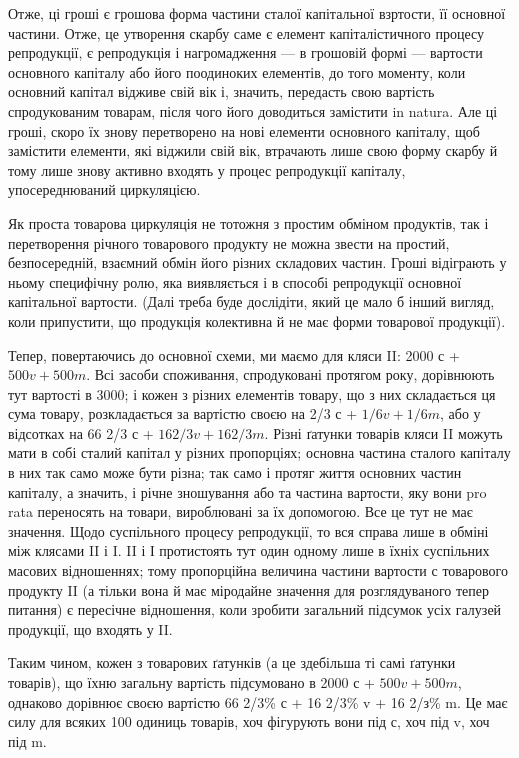 \parcont{}  %
Отже, ці гроші є грошова форма частини сталої капітальної взртости,
її основної частини. Отже, це утворення скарбу саме є елемент капіталістичного
процесу репродукції, є репродукція і нагромадження — в грошовій
формі — вартости основного капіталу або його поодиноких елементів,
до того моменту, коли основний капітал відживе свій вік і, значить, передасть
свою вартість спродукованим товарам, після чого його доводиться
замістити in natura. Але ці гроші, скоро їх знову перетворено на нові
елементи основного капіталу, щоб замістити елементи, які віджили свій
вік, втрачають лише свою форму скарбу й тому лише знову активно
входять у процес репродукції капіталу, упосереднюваний циркуляцією.

Як проста товарова циркуляція не тотожня з простим обміном продуктів,
так і перетворення річного товарового продукту не можна звести на
простий, безпосередній, взаємний обмін його різних складових частин.
Гроші відіграють у ньому специфічну ролю, яка виявляється і в способі
репродукції основної капітальної вартости. (Далі треба буде дослідіти,
який це мало б інший вигляд, коли припустити, що продукція колективна
й не має форми товарової продукції).

Тепер, повертаючись до основної схеми, ми маємо для кляси II:
2000 с + $500 v + 500 m$. Всі засоби споживання, спродуковані протягом
року, дорівнюють тут вартості в 3000; і кожен з різних елементів товару,
що з них складається ця сума товару, розкладається за вартістю своєю
на 2/3 с + $1/6 v + 1/6 m$, або у відсотках на 66 2/3 с + $16 2/3 v + 16 2/3 m$.
Різні ґатунки товарів кляси II можуть мати в собі сталий капітал у
різних пропорціях; основна частина сталого капіталу в них так само
може бути різна; так само і протяг життя основних частин капіталу, а
значить, і річне зношування або та частина вартости, яку вони pro rata
переносять на товари, вироблювані за їх допомогою. Все це тут не має
значення. Щодо суспільного процесу репродукції, то вся справа лише в
обміні між клясами II і I. II і І протистоять тут один одному лише в
їхніх суспільних масових відношеннях; тому пропорційна величина частини
вартости с товарового продукту II (а тільки вона й має міродайне
значення для розглядуваного тепер питання) є пересічне відношення, коли
зробити загальний підсумок усіх галузей продукції, що входять у II.

Таким чином, кожен з товарових ґатунків (а це здебільша ті самі
ґатунки товарів), що їхню загальну вартість підсумовано в 2000 с + $500 v +
500 m$, однаково дорівнює своєю вартістю 66 2/3\% с + 16 2/3\% v +
16 2/з\% m. Це має силу для всяких 100 одиниць товарів, хоч фігурують
вони під с, хоч під v, хоч під m.


